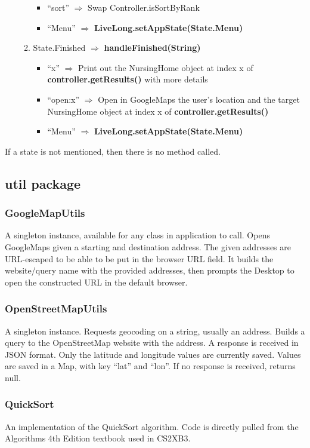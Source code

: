 \documentclass[12pt]{article}
\begin{document}
\begin{itemize}
\begin{enumerate}
\begin{itemize}
		\item ``sort'' $\Rightarrow$ Swap Controller.isSortByRank
		\item ``Menu'' $\Rightarrow$ \textbf{LiveLong.setAppState(State.Menu)}
		\end{itemize}
	\item State.Finished $\Rightarrow$ \textbf{handleFinished(String)}
		\begin{itemize}
		\item ``x'' $\Rightarrow$ Print out the NursingHome object at index x of \textbf{controller.getResults()} with more details
		\item ``open:x'' $\Rightarrow$ Open in GoogleMaps the user's location and the target NursingHome object at index x of \textbf{controller.getResults()} 
		\item ``Menu'' $\Rightarrow$ \textbf{LiveLong.setAppState(State.Menu)}
		\end{itemize}
\end{enumerate}
\end{itemize}
If a state is not mentioned, then there is no method called.

\newpage
\subsection{util package}
\subsubsection{GoogleMapUtils}
A singleton instance, available for any class in application to call. Opens GoogleMaps given a starting and destination address. The given addresses are URL-escaped to be able to be put in the browser URL field. It builds the website/query name with the provided addresses, then prompts the Desktop to open the constructed URL in the default browser.

\subsubsection{OpenStreetMapUtils}
A singleton instance. Requests geocoding on a string, usually an address. Builds a query to the OpenStreetMap website with the address. A response is received in JSON format. Only the latitude and longitude values are currently saved. Values are saved in a Map, with key ``lat'' and ``lon''. If no response is received, returns null.


\subsubsection{QuickSort}
An implementation of the QuickSort algorithm. Code is directly pulled from the Algorithms 4th Edition textbook used in CS2XB3.
\end{document}
